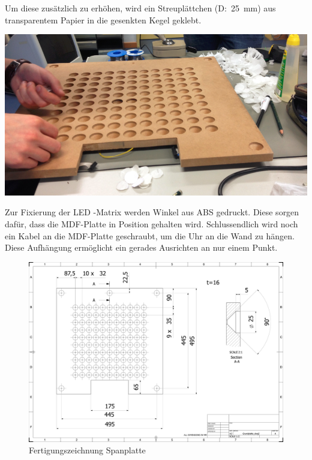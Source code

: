 \begin{multicols}{2}
{}
Um diese zusätzlich zu erhöhen, wird ein Streuplättchen (D:~25~mm) aus transparentem Papier in die gesenkten Kegel geklebt.

{
\centering
\includegraphics[width=0.85\columnwidth]{Abbildungen/Konstruktion/LED02}

}

Zur Fixierung der LED -Matrix werden Winkel aus ABS gedruckt. Diese sorgen dafür, dass die MDF-Platte in Position gehalten wird. Schlussendlich wird noch ein Kabel an die MDF-Platte geschraubt, um die Uhr an die Wand zu hängen. Diese Aufhängung ermöglicht ein gerades Ausrichten an nur einem Punkt.


\end{multicols}

\begin{landscape}
	\begin{figure}
		\centering
		\includegraphics[width=21cm]{Abbildungen/Konstruktion/Grundplatte}
		\caption[Spanplatte]{Fertigungszeichnung Spanplatte}
		\label{fig:Spanplatte}
	\end{figure}
\end{landscape}


